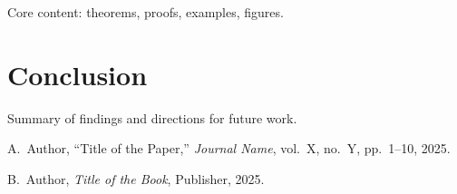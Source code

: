Core content: theorems, proofs, examples, figures.

\section{Conclusion}

Summary of findings and directions for future work.

\articlereferences

\begin{enumerate}[label={[\arabic*]}, leftmargin=2em, itemsep=0.25em]
  \item A.~Author, ``Title of the Paper,'' \textit{Journal Name},
        vol.~X, no.~Y, pp.~1--10, 2025.
  \item B.~Author, \textit{Title of the Book}, Publisher, 2025.
\end{enumerate}
